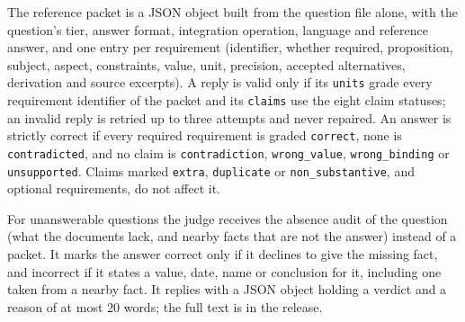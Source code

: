 The reference packet is a JSON object built from the question file alone, with the question's tier, answer format, integration operation, language and reference answer, and one entry per requirement (identifier, whether required, proposition, subject, aspect, constraints, value, unit, precision, accepted alternatives, derivation and source excerpts). A reply is valid only if its \texttt{units} grade every requirement identifier of the packet and its \texttt{claims} use the eight claim statuses; an invalid reply is retried up to three attempts and never repaired. An answer is strictly correct if every required requirement is graded \texttt{correct}, none is \texttt{contradicted}, and no claim is \texttt{contradiction}, \texttt{wrong\_value}, \texttt{wrong\_binding} or \texttt{unsupported}. Claims marked \texttt{extra}, \texttt{duplicate} or \texttt{non\_substantive}, and optional requirements, do not affect it.

For unanswerable questions the judge receives the absence audit of the question (what the documents lack, and nearby facts that are not the answer) instead of a packet. It marks the answer correct only if it declines to give the missing fact, and incorrect if it states a value, date, name or conclusion for it, including one taken from a nearby fact. It replies with a JSON object holding a verdict and a reason of at most 20 words; the full text is in the release.
